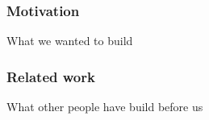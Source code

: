 \begin{frame}
	\frametitle{Motivation}
	What we wanted to build
\end{frame}

\begin{frame}
	\frametitle{Related work}
	What other people have build before us
\end{frame}